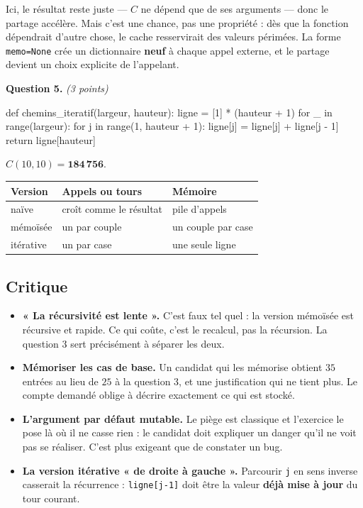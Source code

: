 Ici, le résultat reste juste — $C$ ne dépend que de ses arguments — donc le
partage accélère. Mais c'est une chance, pas une propriété : dès que la
fonction dépendrait d'autre chose, le cache resservirait des valeurs périmées.
La forme \lstinline{memo=None} crée un dictionnaire \textbf{neuf} à chaque
appel externe, et le partage devient un choix explicite de l'appelant.

\medskip
\textbf{Question 5.} \emph{(3 points)}

\begin{python}
def chemins_iteratif(largeur, hauteur):
    ligne = [1] * (hauteur + 1)
    for _ in range(largeur):
        for j in range(1, hauteur + 1):
            ligne[j] = ligne[j] + ligne[j - 1]
    return ligne[hauteur]
\end{python}

$C(10, 10) = \mathbf{184\,756}$.

\begin{center}
\begin{tabular}{|l|l|l|}
\hline
\textbf{Version} & \textbf{Appels ou tours} & \textbf{Mémoire} \\
\hline
naïve & croît comme le résultat & pile d'appels \\
\hline
mémoïsée & un par couple & un couple par case \\
\hline
itérative & un par case & une seule ligne \\
\hline
\end{tabular}
\end{center}

\subsection*{Critique}

\begin{itemize}
  \item \textbf{« La récursivité est lente ».} C'est faux tel quel : la version
    mémoïsée est récursive et rapide. Ce qui coûte, c'est le recalcul, pas la
    récursion. La question 3 sert précisément à séparer les deux.
  \item \textbf{Mémoriser les cas de base.} Un candidat qui les mémorise obtient
    $35$ entrées au lieu de $25$ à la question 3, et une justification qui ne
    tient plus. Le compte demandé oblige à décrire exactement ce qui est stocké.
  \item \textbf{L'argument par défaut mutable.} Le piège est classique et
    l'exercice le pose là où il ne casse rien : le candidat doit expliquer un
    danger qu'il ne voit pas se réaliser. C'est plus exigeant que de constater
    un bug.
  \item \textbf{La version itérative « de droite à gauche ».} Parcourir
    \lstinline{j} en sens inverse casserait la récurrence : \lstinline{ligne[j-1]}
    doit être la valeur \textbf{déjà mise à jour} du tour courant.
\end{itemize}

